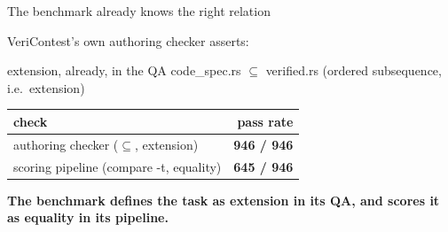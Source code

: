 \documentclass[aspectratio=169,10pt]{beamer}
\newcommand{\code}[1]{{\ttfamily #1}}
\newcommand{\good}[1]{{\color{lgGreen}#1}}
\newcommand{\bad}[1]{{\color{lgRed}#1}}
\begin{document}
\begin{frame}{The benchmark already knows the right relation}

{\scriptsize VeriContest's own authoring checker asserts:}

\vspace{6pt}
\begin{center}
\begin{defbox}{extension, already, in the QA}
\scriptsize
\code{code\_spec.rs} $\subseteq$ \code{verified.rs} \quad(ordered subsequence, i.e.\
extension)
\end{defbox}
\end{center}

\vspace{8pt}
\begin{center}
{\scriptsize
\begin{tabular}{lr}
\toprule
\textbf{check} & \textbf{pass rate} \\
\midrule
authoring checker ($\subseteq$, extension) & \good{\textbf{946 / 946}} \\
scoring pipeline (\code{compare -t}, equality) & \bad{\textbf{645 / 946}} \\
\bottomrule
\end{tabular}
}
\end{center}

\vspace{12pt}
\begin{callout}[lgAccent]
\scriptsize
\textbf{The benchmark defines the task as extension in its QA, and scores it as equality in
its pipeline.}
\end{callout}

\end{frame}
\end{document}

